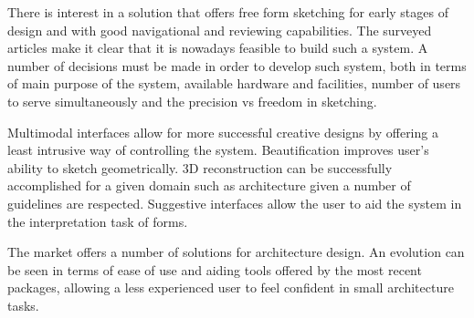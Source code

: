 There is interest in a solution that offers free form sketching for early stages of
design and with good navigational and reviewing capabilities.
The surveyed articles make it clear that it is nowadays feasible to build such a system.
A number of decisions must be made in order to develop such system, both in terms of
main purpose of the system, available hardware and facilities, number of users to serve
simultaneously and the precision vs freedom in sketching.

Multimodal interfaces allow for more successful creative designs by offering a least intrusive
way of controlling the system. Beautification improves user's ability to sketch geometrically.
3D reconstruction can be successfully accomplished for a given domain such as architecture
given a number of guidelines are respected. Suggestive interfaces allow the user to aid the
system in the interpretation task of forms.

The market offers a number of solutions for architecture design.
An evolution can be seen in terms of ease of use and aiding tools offered by the most recent
packages, allowing a less experienced user to feel confident in small architecture tasks.

